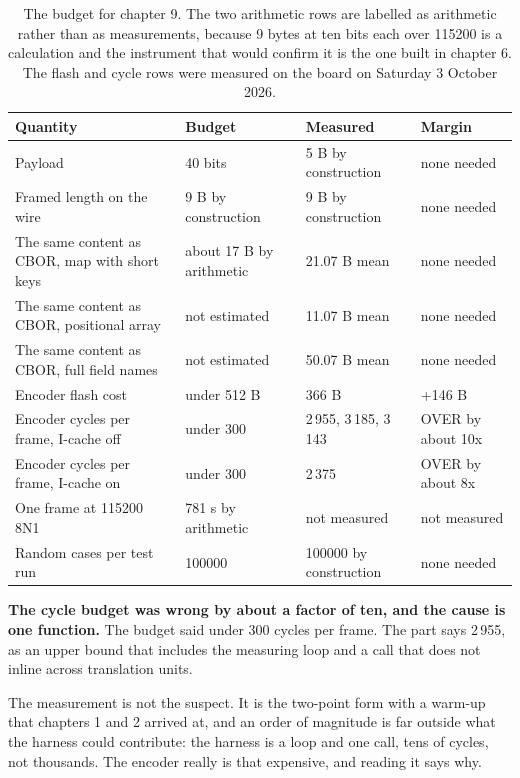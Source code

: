 \begin{table}[H]\centering\small
\begin{tabular}{p{44mm}p{28mm}p{28mm}p{30mm}}
\toprule
Quantity & Budget & Measured & Margin \\
\midrule
Payload & 40 bits & 5 B by construction & none needed \\
Framed length on the wire & 9 B by construction & 9 B by construction & none needed \\
The same content as CBOR, map with short keys & about 17 B by arithmetic & 21.07 B mean & none needed \\
The same content as CBOR, positional array & not estimated & 11.07 B mean & none needed \\
The same content as CBOR, full field names & not estimated & 50.07 B mean & none needed \\
Encoder flash cost & under 512 B & 366 B & +146 B \\
Encoder cycles per frame, I-cache off & under 300 & 2\,955, 3\,185, 3\,143 & OVER by about 10x \\
Encoder cycles per frame, I-cache on & under 300 & 2\,375 & OVER by about 8x \\
One frame at 115200 8N1 & 781 \textmu{}s by arithmetic & not measured & not measured \\
Random cases per test run & 100000 & 100000 by construction & none needed \\
\bottomrule
\end{tabular}
\caption{The budget for chapter 9. The two arithmetic rows are labelled as arithmetic rather than as measurements, because 9 bytes at ten bits each over 115200 is a calculation and the instrument that would confirm it is the one built in chapter 6. The flash and cycle rows were measured on the board on Saturday 3 October 2026.}
\end{table}

\textbf{The cycle budget was wrong by about a factor of ten, and the cause is one
function.} The budget said under 300 cycles per frame. The part says 2\,955, as an
upper bound that includes the measuring loop and a call that does not inline across
translation units.

The measurement is not the suspect. It is the two-point form with a warm-up that
chapters 1 and 2 arrived at, and an order of magnitude is far outside what the
harness could contribute: the harness is a loop and one call, tens of cycles, not
thousands. The encoder really is that expensive, and reading it says why.

